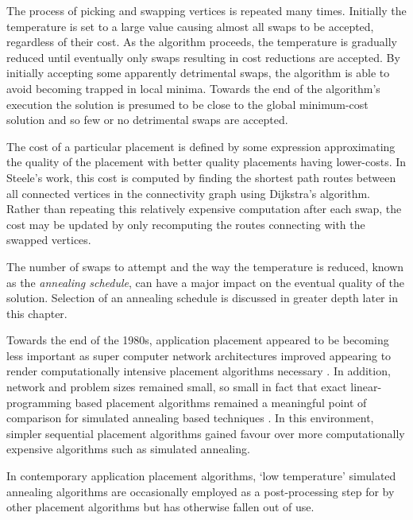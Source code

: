 				The process of picking and swapping vertices is repeated many times.
				Initially the temperature is set to a large value causing almost all
				swaps to be accepted, regardless of their cost. As the algorithm
				proceeds, the temperature is gradually reduced until eventually only
				swaps resulting in cost reductions are accepted. By initially accepting
				some apparently detrimental swaps, the algorithm is able to avoid
				becoming trapped in local minima. Towards the end of the algorithm's
				execution the solution is presumed to be close to the global
				minimum-cost solution and so few or no detrimental swaps are accepted.
				
				The cost of a particular placement is defined by some expression
				approximating the quality of the placement with better quality
				placements having lower-costs. In Steele's work, this cost is computed
				by finding the shortest path routes between all connected vertices in
				the connectivity graph using Dijkstra's algorithm. Rather than
				repeating this relatively expensive computation after each swap, the
				cost may be updated by only recomputing the routes connecting with the
				swapped vertices.
				
				The number of swaps to attempt and the way the temperature is reduced,
				known as the \emph{annealing schedule}, can have a major impact on the
				eventual quality of the solution. Selection of an annealing schedule is
				discussed in greater depth later in this chapter.
				
				Towards the end of the 1980s, application placement appeared to be
				becoming less important as super computer network architectures
				improved appearing to render computationally intensive placement
				algorithms necessary \cite{dally87}.  In addition, network and problem
				sizes remained small, so small in fact that exact linear-programming
				based placement algorithms remained a meaningful point of comparison
				for simulated annealing based techniques \cite{xu91}.  In this
				environment, simpler sequential placement algorithms gained favour over
				more computationally expensive algorithms such as simulated annealing.
				
				In contemporary application placement algorithms, `low temperature'
				simulated annealing algorithms are occasionally employed as a
				post-processing step for by other placement algorithms \cite{hoefler11}
				but has otherwise fallen out of use.
				
			
